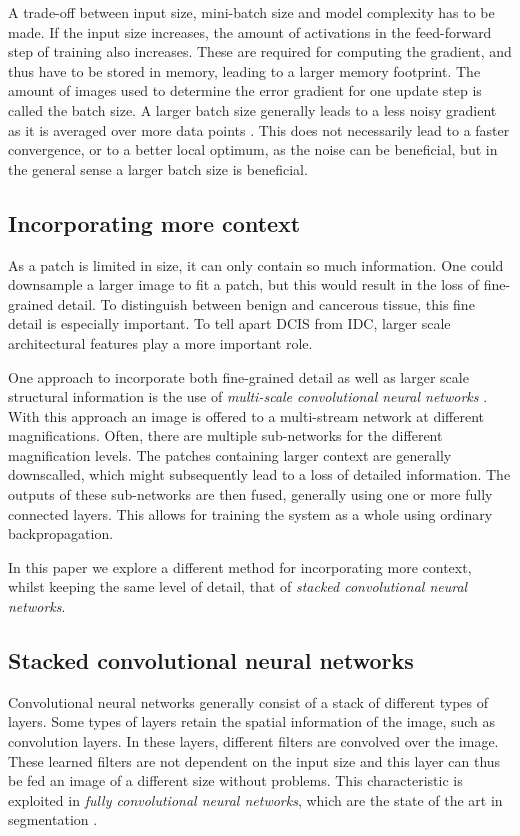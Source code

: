\documentclass[journal]{IEEEtran}
\begin{document}
A trade-off between input size, mini-batch size and model complexity has to be made. If the input size increases, the amount of activations in the feed-forward step of training also increases. These are required for computing the gradient, and thus have to be stored in memory, leading to a larger memory footprint. The amount of images used to determine the error gradient for one update step is called the batch size. A larger batch size generally leads to a less noisy gradient as it is averaged over more data points \cite{bottou2016optimization}. This does not necessarily lead to a faster convergence, or to a better local optimum, as the noise can be beneficial, but in the general sense a larger batch size is beneficial. 

\subsection{Incorporating more context}

As a patch is limited in size, it can only contain so much information. One could downsample a larger image to fit a patch, but this would result in the loss of fine-grained detail. To distinguish between benign and cancerous tissue, this fine detail is especially important. To tell apart DCIS from IDC, larger scale architectural features play a more important role. 

One approach to incorporate both fine-grained detail as well as larger scale structural information is the use of \emph{multi-scale convolutional neural networks} \cite{multiscale_shen,buyssens2012multiscale}. With this approach an image is offered to a multi-stream network at different magnifications. Often, there are multiple sub-networks for the different magnification levels. The patches containing larger context are generally downscalled, which might subsequently lead to a loss of detailed information. The outputs of these sub-networks are then fused, generally using one or more fully connected layers. This allows for training the system as a whole using ordinary backpropagation.

In this paper we explore a different method for incorporating more context, whilst keeping the same level of detail, that of \emph{stacked convolutional neural networks}.  

\subsection{Stacked convolutional neural networks}
Convolutional neural networks generally consist of a stack of different types of layers. Some types of layers retain the spatial information of the image, such as convolution layers. In these layers, different filters are convolved over the image. These learned filters are not dependent on the input size and this layer can thus be fed an image of a different size without problems. This characteristic is exploited in \emph{fully convolutional neural networks}, which are the state of the art in segmentation \cite{long2015fully}. 
\end{document}

